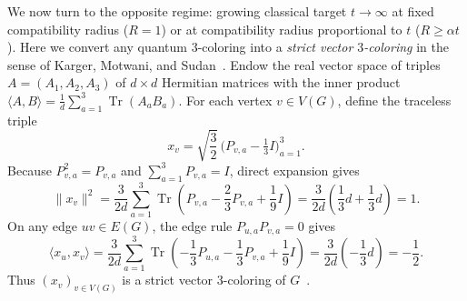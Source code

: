 We now turn to the opposite regime: growing classical target $t\to\infty$ at fixed compatibility radius ($R=1$) or at compatibility radius proportional to $t$ ($R\ge\alpha t$). Here we convert any quantum $3$-coloring into a \emph{strict vector $3$-coloring} in the sense of Karger, Motwani, and Sudan~\cite{KMS}. Endow the real vector space of triples $A=(A_1,A_2,A_3)$ of $d\times d$ Hermitian matrices with the inner product $\langle A,B\rangle=\frac1d\sum_{a=1}^3\operatorname{Tr}(A_aB_a)$. For each vertex $v\in V(G)$, define the traceless triple
\begin{equation}\label{eq:strict-vectors}
 x_v=\sqrt{\frac32}\,\bigl(P_{v,a}-\tfrac13 I\bigr)_{a=1}^3.
\end{equation}
Because $P_{v,a}^2=P_{v,a}$ and $\sum_{a=1}^3 P_{v,a}=I$, direct expansion gives
\[
 \|x_v\|^2=\frac{3}{2d}\sum_{a=1}^3\operatorname{Tr}\!\left(P_{v,a}-\frac23 P_{v,a}+\frac19 I\right)
 =\frac{3}{2d}\left(\frac13 d+\frac13 d\right)=1.
\]
On any edge $uv\in E(G)$, the edge rule $P_{u,a}P_{v,a}=0$ gives
\[
 \langle x_u,x_v\rangle=\frac{3}{2d}\sum_{a=1}^3\operatorname{Tr}\!\left(-\frac13 P_{u,a}-\frac13 P_{v,a}+\frac19 I\right)
 =\frac{3}{2d}\left(-\frac13 d\right)=-\frac12.
\]
Thus $(x_v)_{v\in V(G)}$ is a strict vector $3$-coloring of $G$~\cite{KMS}.

